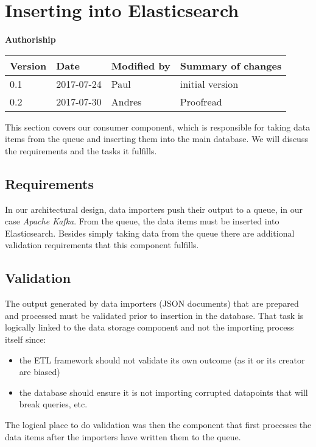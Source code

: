 \section{Inserting into Elasticsearch}\label{sec:inserting}

\textbf{Authoriship}

\begin{longtable}[]{@{}llll@{}}
\toprule
Version & Date & Modified by & Summary of changes\tabularnewline
\midrule
\endhead
0.1 & 2017-07-24 & Paul & initial version\tabularnewline
0.2 & 2017-07-30 & Andres & Proofread\tabularnewline
\bottomrule
\end{longtable}

This section covers our consumer component, which is responsible for
taking data items from the queue and inserting them into the main
database. We will discuss the requirements and the tasks it fulfills.

\subsection{Requirements}\label{requirements}

In our architectural design, data importers push their output to a
queue, in our case \emph{Apache Kafka}. From the queue, the data items
must be inserted into Elasticsearch. Besides simply taking data from the
queue there are additional validation requirements that this component
fulfills.

\subsection{Validation}\label{validation}

The output generated by data importers (JSON documents) that are
prepared and processed must be validated prior to insertion in the
database. That task is logically linked to the data storage component
and not the importing process itself since:

\begin{itemize}
\tightlist
\item
  the ETL framework should not validate its own outcome (as it or its
  creator are biased)
\item
  the database should ensure it is not importing corrupted datapoints
  that will break queries, etc.
\end{itemize}

The logical place to do validation was then the component that first
processes the data items after the importers have written them to the
queue.

